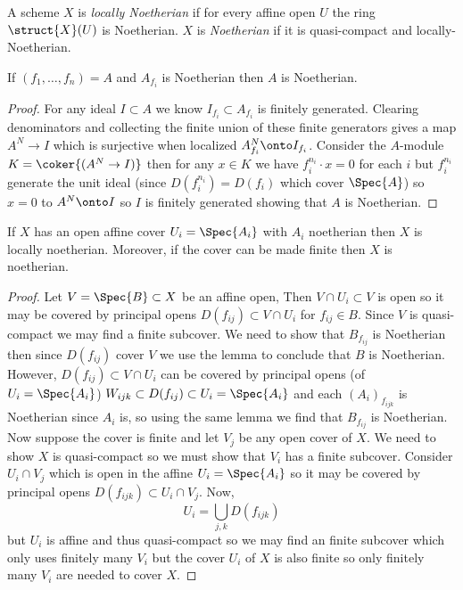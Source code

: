 \documentclass[12pt]{article}
\begin{document}
\begin{defn}
A scheme $X$ is \textit{locally Noetherian} if for every affine open $U$ the ring $\struct{X}(U)$ is Noetherian. $X$ is \textit{Noetherian} if it is quasi-compact and locally-Noetherian. 
\end{defn}

\begin{lemma}
If $(f_1, \dots, f_n) = A$ and $A_{f_i}$ is Noetherian then $A$ is Noetherian.
\end{lemma}

\begin{proof}
For any ideal $I \subset A$ we know $I_{f_i} \subset A_{f_i}$ is finitely generated. Clearing denominators and collecting the finite union of these finite generators gives a map $A^N \to I$ which is surjective when localized $A^N_{f_i} \onto I_{f_i}$. Consider the $A$-module $K = \coker{(A^N \to I)}$ then for any $x \in K$ we have $f_i^{n_i} \cdot x = 0$ for each $i$ but $f_i^{n_i}$ generate the unit ideal (since $D(f_i^{n_i}) = D(f_i)$ which cover $\Spec{A}$) so $x = 0$ to $A^N \onto I$ so $I$ is finitely generated showing that $A$ is Noetherian.
\end{proof}

\begin{lemma}
If $X$ has an open affine cover $U_i = \Spec{A_i}$ with $A_i$ noetherian then $X$ is locally noetherian. Moreover, if the cover can be made finite then $X$ is noetherian. 
\end{lemma}

\begin{proof}
Let $V = \Spec{B} \subset X$ be an affine open, Then $V \cap U_i \subset V$ is open so it may be covered by principal opens $D(f_{ij}) \subset V \cap U_i$ for $f_{ij} \in B$. Since $V$ is quasi-compact we may find a finite subcover. We need to show that $B_{f_{ij}}$ is Noetherian then since $D(f_{ij})$ cover $V$ we use the lemma to conclude that $B$ is Noetherian. However, $D(f_{ij}) \subset V \cap U_i$ can be covered by principal opens (of $U_i = \Spec{A_i}$) $W_{ijk} \subset D(f_{ij}) \subset U_i = \Spec{A_i}$ and each $(A_i)_{f_{ijk}}$ is Noetherian since $A_i$ is, so using the same lemma we find that $B_{f_{ij}}$ is Noetherian. 
\bigskip\\
Now suppose the cover is finite and let $V_j$ be any open cover of $X$. We need to show $X$ is quasi-compact so we must show that $V_i$ has a finite subcover. Consider $U_i \cap V_j$  which is open in the affine $U_i = \Spec{A_i}$ so it may be covered by principal opens $D(f_{ijk}) \subset U_i \cap V_j$. Now,
\[ U_i = \bigcup_{j,k} D(f_{ijk}) \]
but $U_i$ is affine and thus quasi-compact so we may find an finite subcover which only uses finitely many $V_i$ but the cover $U_i$ of $X$ is also finite so only finitely many $V_i$ are needed to cover $X$.  
\end{proof}
\end{document}

